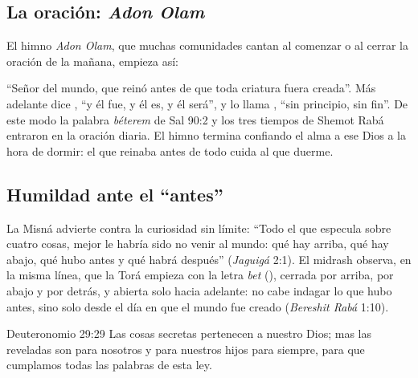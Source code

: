\subsection{La oración: \emph{Adon Olam}}
El himno \emph{Adon Olam}, que muchas comunidades cantan al comenzar o al cerrar la oración de la mañana, empieza así:


``Señor del mundo, que reinó antes de que toda criatura fuera creada''. Más adelante dice , ``y él fue, y él es, y él será'', y lo llama , ``sin principio, sin fin''. De este modo la palabra \emph{béterem} de Sal 90:2 y los tres tiempos de Shemot Rabá entraron en la oración diaria. El himno termina confiando el alma a ese Dios a la hora de dormir: el que reinaba antes de todo cuida al que duerme.


\subsection{Humildad ante el “antes”}
La Misná advierte contra la curiosidad sin límite: ``Todo el que especula sobre cuatro cosas, mejor le habría sido no venir al mundo: qué hay arriba, qué hay abajo, qué hubo antes y qué habrá después'' (\emph{Jaguigá} 2:1). El midrash observa, en la misma línea, que la Torá empieza con la letra \emph{bet} (), cerrada por arriba, por abajo y por detrás, y abierta solo hacia adelante: no cabe indagar lo que hubo antes, sino solo desde el día en que el mundo fue creado (\emph{Bereshit Rabá} 1:10).

\begin{verso}{Deuteronomio 29:29}
Las cosas secretas pertenecen a \SENOR{} nuestro Dios; mas las reveladas son para nosotros y para nuestros hijos para siempre, para que cumplamos todas las palabras de esta ley.
\end{verso}



